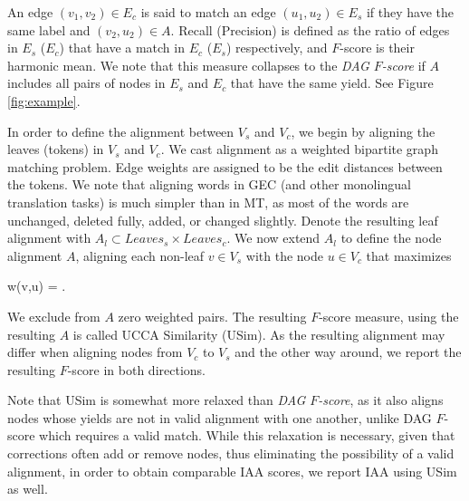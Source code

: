 \documentclass[a4paper, 11pt]{article}
\newenvironment{myequation*}{
	\vspace{-1em}
	\begin{equation*}
}{
\end{equation*}
\vspace{-1.2em}
}
\begin{document}
An edge $(v_1,v_2) \in E_c$ is said to match an edge
$(u_1,u_2) \in E_s$ if they have the same label and $(v_2,u_2) \in A$. Recall (Precision)
is defined as the ratio of edges in $E_s$ ($E_c$) that have a match in $E_c$ ($E_s$) respectively, and
$F$-score is their harmonic mean. We note that this measure collapses to the
{\it DAG $F$-score} if $A$ includes all pairs of nodes in $E_s$ and $E_c$ that have
the same yield. See Figure \ref{fig:example}. 

In order to define the alignment between $V_s$ and $V_c$, we begin by aligning the leaves
(tokens) in $V_s$ and $V_c$.
We cast alignment as a weighted bipartite graph matching problem. Edge weights are assigned to be the edit distances between the tokens.
We note that aligning words in GEC (and other monolingual translation tasks) is much simpler than in MT,
as most of the words are unchanged, deleted fully, added, or changed slightly.
Denote the resulting leaf alignment with $A_l \subset Leaves_s \times Leaves_c$.
We now extend $A_l$ to define the node alignment $A$, aligning each non-leaf $v \in V_s$
with the node $u \in V_c$ that maximizes

\begin{small}
	\vspace{0.15cm}
 \begin{myequation*}
  w\left(v,u\right) = .
 \end{myequation*}
\end{small}

We exclude from $A$ zero weighted pairs.
The resulting $F$-score measure, using the resulting $A$ is called UCCA Similarity ({\sc USim}).
As the resulting alignment may differ when aligning nodes from $V_c$ to $V_s$
and the other way around, we report the resulting $F$-score in both directions.

Note that {\sc USim} is somewhat more relaxed than {\it DAG $F$-score},
as it also aligns nodes whose yields are not in valid alignment with one another,
unlike DAG $F$-score which requires a valid match.
While this relaxation is necessary, given that corrections often add
or remove nodes, thus eliminating the possibility of a valid alignment,
in order to obtain comparable IAA scores, we report IAA using {\sc USim} as well.
%
\end{document}
